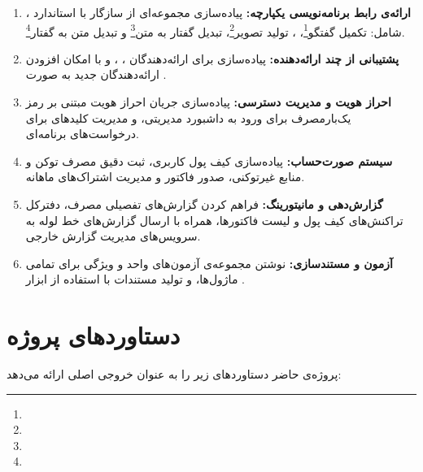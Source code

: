 \begin{enumerate}
  \item \textbf{ارائه‌ی رابط برنامه‌نویسی یکپارچه:}
    پیاده‌سازی مجموعه‌ای از  سازگار با
    استاندارد ، شامل: تکمیل گفتگو\footnote{}،
    ، تولید تصویر\footnote{}،
    تبدیل گفتار به متن\footnote{} و
    تبدیل متن به گفتار\footnote{}.

  \item \textbf{پشتیبانی از چند ارائه‌دهنده:}
    پیاده‌سازی  برای ارائه‌دهندگان ،
    ،  و  با امکان افزودن ارائه‌دهندگان
    جدید به صورت .

  \item \textbf{احراز هویت و مدیریت دسترسی:}
    پیاده‌سازی جریان احراز هویت مبتنی بر رمز یک‌بارمصرف برای ورود به
    داشبورد مدیریتی، و مدیریت کلیدهای  برای درخواست‌های برنامه‌ای.

  \item \textbf{سیستم صورت‌حساب:}
    پیاده‌سازی کیف پول کاربری، ثبت دقیق مصرف توکن و منابع غیرتوکنی،
    صدور فاکتور و مدیریت اشتراک‌های ماهانه.

  \item \textbf{گزارش‌دهی و مانیتورینگ:}
    فراهم کردن گزارش‌های تفصیلی مصرف، دفترکل تراکنش‌های کیف پول و
    لیست فاکتورها، همراه با ارسال گزارش‌های خط لوله به سرویس‌های
    مدیریت گزارش خارجی.

  \item \textbf{آزمون و مستندسازی:}
    نوشتن مجموعه‌ی آزمون‌های واحد و ویژگی برای تمامی ماژول‌ها، و
    تولید مستندات  با استفاده از ابزار .
\end{enumerate}

\section{دستاوردهای پروژه}
\label{sec:contributions}

پروژه‌ی حاضر دستاوردهای زیر را به عنوان خروجی اصلی ارائه می‌دهد:

